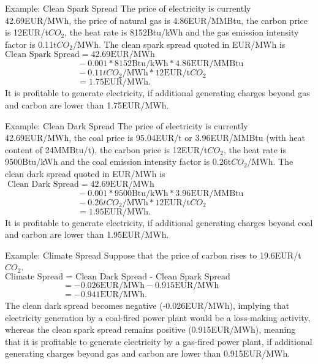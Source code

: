 Example: Clean Spark Spread
	The price of electricity is currently 42.69EUR/MWh, the price of natural gas is 4.86EUR/MMBtu, the carbon price is 12EUR/t$CO_2$, the heat 
	rate is 8152Btu/kWh and the gas emission intensity factor is 0.11t$CO_2$/MWh. The clean spark spread quoted in EUR/MWh is\\
	$\text{Clean Spark Spread}=42.69\text{EUR/MWh}$\\
	$\qquad\qquad\qquad\qquad\;\,-0.001\ast8152\text{Btu/kWh}\ast4.86\text{EUR/MMBtu}$\\
	$\qquad\qquad\qquad\qquad\;\,-0.11tCO_2\text{/MWh}\ast12\text{EUR/t}CO_2$\\
	$\qquad\qquad\qquad\qquad\;\,=1.75\text{EUR/MWh}.$\\
	\vspace{0.2cm}
	It is profitable to generate electricity, if additional generating charges beyond gas and carbon are lower than 1.75EUR/MWh.


Example: Clean Dark Spread
	The price of electricity is currently 42.69EUR/MWh, the coal price is 95.04EUR/t or 3.96EUR/MMBtu (with heat content of 24MMBtu/t), 
	the carbon price is 12EUR/t$CO_2$, the heat rate is 9500Btu/kWh and the coal emission intensity factor is 0.26t$CO_2$/MWh. The clean dark spread quoted in EUR/MWh is\\
	$\;\text{Clean Dark Spread}=42.69\text{EUR/MWh}$\\
	$\qquad\qquad\qquad\qquad\;\,-0.001\ast9500\text{Btu/kWh}\ast3.96\text{EUR/MMBtu}$\\
	$\qquad\qquad\qquad\qquad\;\,-0.26tCO_2\text{/MWh}\ast12\text{EUR/t}CO_2$\\
	$\qquad\qquad\qquad\qquad\;\,=1.95\text{EUR/MWh}.$\\
	\vspace{0.2cm}
	It is profitable to generate electricity, if additional generating charges beyond coal and carbon are lower than 1.95EUR/MWh.


Example: Climate Spread
Suppose that the price of carbon rises to 19.6EUR/t$CO_2$.\\
\vspace{0.25cm}
$\text{Climate Spread = Clean Dark Spread - Clean Spark Spread}$\\
$\qquad\qquad\qquad\;\;\,=-0.026\text{EUR/MWh}-0.915\text{EUR/MWh}$\\
$\qquad\qquad\qquad\;\;\,=-0.941\text{EUR/MWh}.$\\
\vspace{0.25cm}
The clean dark spread becomes negative (-0.026EUR/MWh), implying that electricity generation by a coal-fired power plant would be a loss-making activity, whereas the clean spark spread remains positive (0.915EUR/MWh), meaning that it is profitable to generate electricity by a gas-fired power plant, if additional generating charges beyond gas and carbon are lower than 0.915EUR/MWh.



